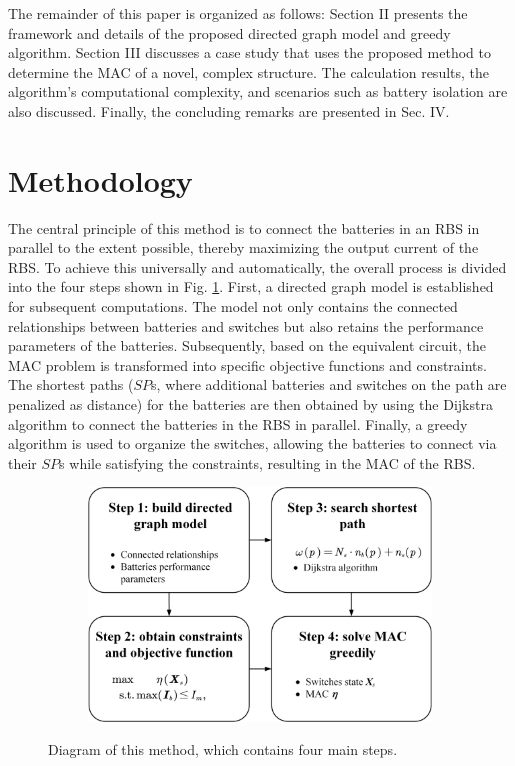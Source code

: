 \documentclass{article}
\begin{document}
The remainder of this paper is organized as follows: 
Section II presents the framework and details of the proposed directed graph model and  greedy algorithm. 
Section III discusses a case study that uses the proposed method to determine the MAC of a novel, complex structure. 
The calculation results, the algorithm's computational complexity, and scenarios such as battery isolation are also discussed. 
Finally, the concluding remarks are presented in Sec. IV.

\section{Methodology}

The central principle of this method is to connect the batteries in an RBS in parallel to the extent possible, thereby maximizing the output current of the RBS.
To achieve this universally and automatically, the overall process is divided into the four steps shown in Fig. \ref{fig:main}.
First, a directed graph model is established for subsequent computations. The model not only contains the connected relationships between batteries and switches but also retains the performance parameters of the batteries.
Subsequently, based on the equivalent circuit, the MAC problem is transformed into specific objective functions and constraints.
The shortest paths ($SP$s, where additional batteries and switches on the path are penalized as distance) for the batteries are then obtained  by using the Dijkstra algorithm to connect the batteries in the RBS in parallel.
Finally, a greedy algorithm is used to organize the switches, allowing the batteries to connect via their $SP$s while satisfying the constraints, resulting in the MAC of the RBS.

\begin{figure}[htbp]
    \centering
    \begin{subfigure}[b]{0.8\textwidth}
        \includegraphics[width=\textwidth]{main.png}
    \end{subfigure}
    \caption{ 
        Diagram of this method, which contains four main steps.
    }
    \label{fig:main}
\end{figure}
\end{document}
